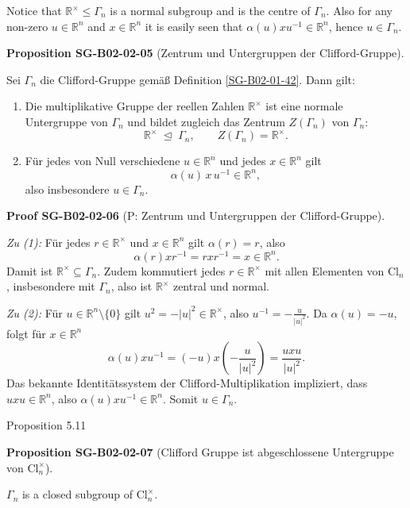 \documentclass[10pt, letterpaper]{article}
\newcommand{\R}{\mathbb{R}}
\newcommand{\Cl}{\mathrm{Cl}}
\newcommand{\CustomHeading}[3]{%
  \par\medskip\noindent%
  \textbf{#1 #2} \textnormal{(#3)}.\enskip%
}
\newenvironment{PROP}[2]{\begin{unitbox}\CustomHeading{Proposition}{#1}{#2}}{\end{unitbox}}
\newenvironment{PROOF}[2]{\begin{unitbox}\CustomHeading{Proof}{#1}{#2}}{\end{unitbox}}
\begin{document}
Notice that $\mathbb{R}^{\times} \leqslant \Gamma_{n}$ is a normal subgroup and is the centre of $\Gamma_{n}$. Also for any non-zero $u \in \mathbb{R}^{n}$ and $x \in \mathbb{R}^{n}$ it is easily seen that $\alpha(u) x u^{-1} \in \mathbb{R}^{n}$, hence $u \in \Gamma_{n}$.



\begin{PROP}{SG-B02-02-05}{Zentrum und Untergruppen der Clifford-Gruppe}
Sei \(\Gamma_n\) die Clifford-Gruppe gemäß Definition \ref{SG-B02-01-42}. Dann gilt:
\begin{enumerate}
\item Die multiplikative Gruppe der reellen Zahlen \(\R^{\times}\) ist eine normale Untergruppe von \(\Gamma_n\)
und bildet zugleich das Zentrum \(Z(\Gamma_n)\) von \(\Gamma_n\):
\[
\R^{\times} \;\trianglelefteq\; \Gamma_n,
\qquad
Z(\Gamma_n)=\R^{\times}.
\]
\item Für jedes von Null verschiedene \(u\in\R^n\) und jedes \(x\in\R^n\) gilt
\[
\alpha(u)\,x\,u^{-1}\in\R^n,
\]
also insbesondere \(u\in\Gamma_n\).
\end{enumerate}
\end{PROP}



\begin{PROOF}{SG-B02-02-06}{P: Zentrum und Untergruppen der Clifford-Gruppe}
\emph{Zu (1):}  
Für jedes \(r\in\R^{\times}\) und \(x\in\R^n\) gilt \(\alpha(r)=r\), also
\[
\alpha(r)x r^{-1}=r x r^{-1}=x\in\R^n.
\]
Damit ist \(\R^{\times}\subseteq\Gamma_n\).
Zudem kommutiert jedes \(r\in\R^{\times}\) mit allen Elementen von \(\Cl_n\),
insbesondere mit \(\Gamma_n\), also ist \(\R^{\times}\) zentral und normal.

\smallskip
\emph{Zu (2):}  
Für \(u\in\R^n\setminus\{0\}\) gilt \(u^2=-|u|^2\in\R^{\times}\),
also \(u^{-1}=-\frac{u}{|u|^2}\).
Da \(\alpha(u)=-u\), folgt für \(x\in\R^n\)
\[
\alpha(u)x u^{-1}=(-u)x\!\left(-\frac{u}{|u|^2}\right)=\frac{u x u}{|u|^2}.
\]
Das bekannte Identitätssystem der Clifford-Multiplikation impliziert,
dass \(u x u \in \R^n\), also \(\alpha(u)x u^{-1}\in\R^n\).  
Somit \(u\in\Gamma_n\).
\end{PROOF}



Proposition 5.11


\begin{PROP}{SG-B02-02-07}{Clifford Gruppe ist abgeschlossene Untergruppe von $\Cl_n^\times$}
$\Gamma_{n}$ is a closed subgroup of $\mathrm{Cl}_{n}^{\times}$.
\end{PROP}
\end{document}
